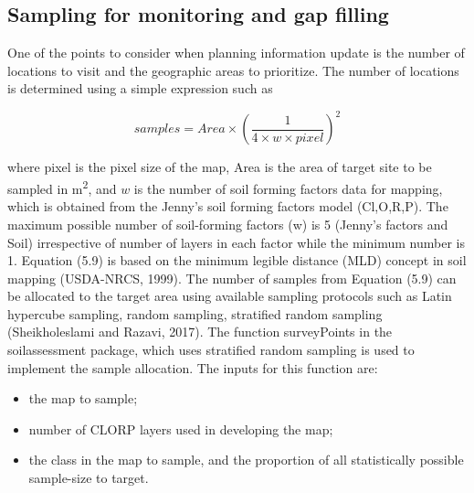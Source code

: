 \documentclass[
  10pt,
  b5paper,
]{book}
\providecommand{\tightlist}{%
  \setlength{\itemsep}{0pt}\setlength{\parskip}{0pt}}
\begin{document}
\hypertarget{sampling-for-monitoring-and-gap-filling}{%
\subsection{Sampling for monitoring and gap filling}\label{sampling-for-monitoring-and-gap-filling}}

One of the points to consider when planning information update is the number of locations to visit and the geographic areas to prioritize. The number of locations is determined using a simple expression such as

\begin{equation}
\tag{5.9}
samples = Area \times (\frac{1}{4\times w \times pixel})^2
\end{equation}

where pixel is the pixel size of the map, Area is the area of target site to be sampled in m\textsuperscript{2}, and \(w\) is the number of soil forming factors data for mapping, which is obtained from the Jenny's soil forming factors model (Cl,O,R,P). The maximum possible number of soil-forming factors (w) is 5 (Jenny's factors and Soil) irrespective of number of layers in each factor while the minimum number is 1. Equation (5.9) is based on the minimum legible distance (MLD) concept in soil mapping (USDA-NRCS, 1999).
The number of samples from Equation (5.9) can be allocated to the target area using available sampling protocols such as Latin hypercube sampling, random sampling, stratified random sampling (Sheikholeslami and Razavi, 2017). The function surveyPoints in the soilassessment package, which uses stratified random sampling is used to implement the sample allocation. The inputs for this function are:

\begin{itemize}
\tightlist
\item
  the map to sample;
\item
  number of CLORP layers used in developing the map;
\item
  the class in the map to sample, and the proportion of all statistically possible sample-size to target.
\end{itemize}
\end{document}
